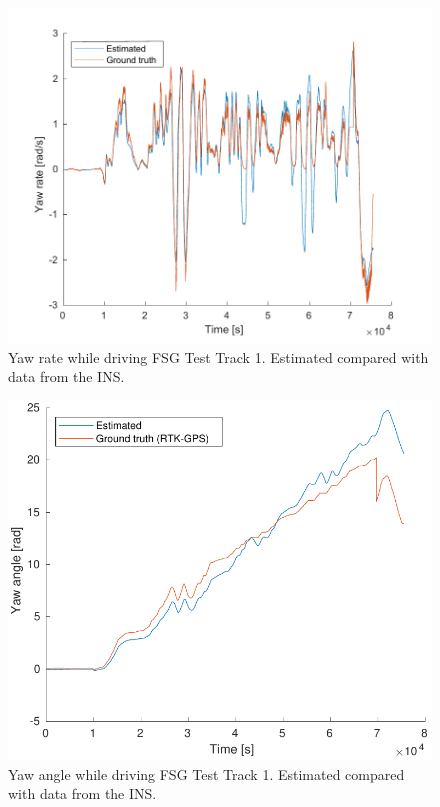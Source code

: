 \begin{figure}
    \centering
    \includegraphics[width=0.8\linewidth]{0_Images/6_Results/rFSGTestTrack.pdf}
    \caption[Yaw rate while driving FSG Test Track 1.]
    {Yaw rate while driving FSG Test Track 1. Estimated compared with data from the INS.}
    \label{Fig:RFSGTestTrack}
\end{figure}

\begin{figure}
    \centering
    \includegraphics[width=0.8\linewidth]{0_Images/6_Results/yawFSGTestTrack.pdf}
    \caption[Yaw angle while driving FSG Test Track 1.]
    {Yaw angle while driving FSG Test Track 1. Estimated compared with data from the INS.}
    \label{Fig:YawFSGTestTrack}
\end{figure}

